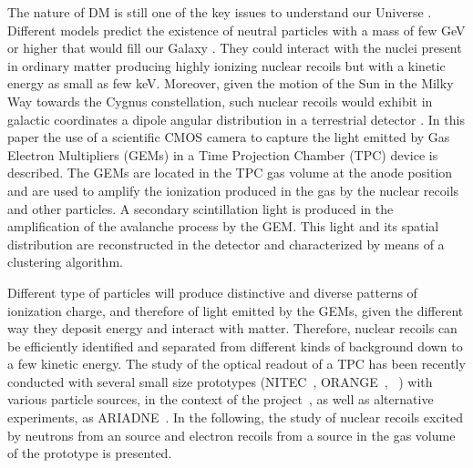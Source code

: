 \documentclass[12pt]{iopart}
\begin{document}
The nature of DM is still one of the key issues to understand our
Universe \cite{PhysRevLett.39.165,Undagoitia_2015}.  Different models
predict the existence of neutral particles with a mass of few GeV or
higher that would fill our Galaxy
\cite{PhysRevLett.113.171301,PhysRevD.79.115016,doi:10.1142/S0217751X13300287,ZUREK201491}. They
could interact with the nuclei present in ordinary matter producing
highly ionizing nuclear recoils but with a kinetic energy as small as
few keV. Moreover, given the motion of the Sun in the Milky Way
towards the Cygnus constellation, such nuclear recoils would exhibit
in galactic coordinates a dipole angular distribution in a terrestrial
detector \cite{MAYET20161}.  In this paper the use of a scientific
CMOS camera to capture the light emitted by Gas Electron Multipliers
(GEMs) in a Time Projection Chamber (TPC) device is described. The
GEMs are located in the TPC gas volume at the anode position and are
used to amplify the ionization produced in the gas by the nuclear
recoils and other particles. A secondary scintillation light is
produced in the amplification of the avalanche process by the GEM.
This light and its spatial distribution are reconstructed in the
detector and characterized by means of a clustering algorithm.


Different type of particles will produce distinctive and diverse
patterns of ionization charge, and therefore of light emitted by the
GEMs, given the different way they deposit energy and interact with
matter.  Therefore, nuclear recoils can be efficiently identified and
separated from different kinds of background down to a few \keV
kinetic energy.  The study of the optical readout of a TPC has been
recently conducted with several small size prototypes
(NITEC~\cite{JINST:nitec},
ORANGE~\cite{NIM:Marafinietal,bib:jinst_orange2},
\lemon~\cite{bib:eps, bib:ieee17,bib:elba}) with various particle
sources, in the context of the \cygno
project~\cite{Abritta_Costa_2020,CYGNOweb}, as well as alternative
experiments, as ARIADNE~\cite{Roberts_2019}. In the following, the
study of nuclear recoils excited by neutrons from an \ambe source and
electron recoils from a \fe source in the gas volume of the \lemon
prototype is presented.
\end{document}
